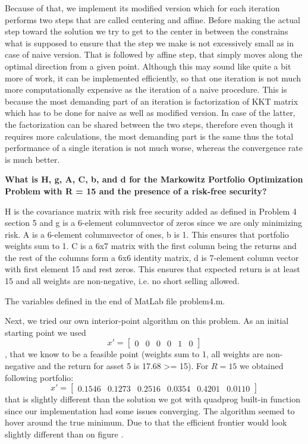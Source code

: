 Because of that, we implement its modified version which for each iteration performs two steps that are called centering and affine. Before making the actual step toward the solution we try to get to the center in between the constrains what is supposed to ensure that the step we make is not excessively small as in case of naive version. That is followed by affine step, that simply moves along the optimal direction from a given point. Although this may sound like quite a bit more of work, it can be implemented efficiently, so that one iteration is not much more computationally expensive as the iteration of a naive procedure. This is because the most demanding part of an iteration is factorization of KKT matrix which has to be done for naive as well as modified version. In case of the latter, the factorization can be shared between the two steps, therefore even though it requires more calculations, the most demanding part is the same thus the total performance of a single iteration is not much worse, whereas the convergence rate is much better.



\textbf{What is H, g, A, C, b, and d for the Markowitz Portfolio Optimization Problem with R = 15 and the presence of a risk-free security?}

H is the covariance matrix with risk free security added as defined in Problem 4 section 5 and g is a 6-element  columnvector of zeros since we are only minimizing risk. A is a 6-element columnvector of ones, b is 1. This ensures that portfolio weights sum to 1. C is a 6x7 matrix with the first column being the returns and the rest of the columns form a 6x6 identity matrix, d is 7-element column vector with first element 15 and rest zeros. This ensures that expected return is at least 15 and all weights are non-negative, i.e. no short selling allowed.

The variables defined in the end of MatLab file problem4.m.

Next, we tried our own interior-point algorithm on this problem. As an initial starting point we used 
\[x'= \begin{bmatrix}
    0 &
    0 & 
    0 &
    0 &
    1 &
    0
\end{bmatrix}
\], that we know to be a feasible point (weights sum to 1, all weights are non-negative and the return for asset 5 is 17.68 >= 15). For $R=15$ we obtained following portfolio:
\[x'= \begin{bmatrix}
    0.1546 &
    0.1273 &
    0.2516 &
    0.0354 &
    0.4201 &
    0.0110
\end{bmatrix}
\]
that is slightly different than the solution we got with quadprog built-in function since our implementation had some issues converging. The algorithm seemed to hover around the true minimum. Due to that the efficient frontier would look slightly different than on figure \label{fig:frontier_2}.   
    
